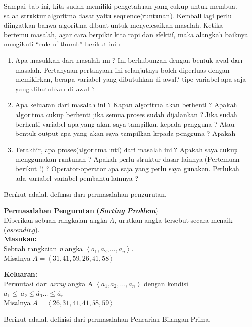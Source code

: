Sampai bab ini, kita sudah memiliki pengetahuan yang cukup untuk membuat salah struktur algoritma dasar yaitu sequence(runtunan).  Kembali lagi perlu diingatkan bahwa algoritma dibuat untuk menyelesaikan masalah. Ketika bertemu masalah, agar cara berpikir kita rapi dan efektif, maka alangkah baiknya mengikuti “rule of thumb” berikut ini : 
\begin{enumerate}
	\item Apa masukkan dari masalah ini ? Ini berhubungan dengan bentuk awal dari  masalah. Pertanyaan-pertanyaan ini selanjutnya boleh diperluas dengan memikirkan, berapa variabel yang dibutuhkan di awal? tipe variabel apa saja yang dibutuhkan  di awal ?
	\item Apa keluaran dari masalah ini ? Kapan algoritma akan berhenti ? Apakah algoritma cukup berhenti jika semua proses sudah dijalankan ?  Jika sudah berhenti variabel apa yang akan saya tampilkan kepada pengguna ? Atau bentuk output apa yang akan saya tampilkan kepada pengguna ?  Apakah 
	\item Terakhir, apa proses(algoritma inti) dari masalah ini ? Apakah saya cukup menggunakan runtunan ? Apakah perlu struktur dasar lainnya (Pertemuan berikut !) ? Operator-operator apa saja yang perlu saya gunakan. Perlukah ada variabel-variabel pembantu lainnya ?
\end{enumerate}
Berikut adalah definisi dari permasalahan pengurutan.
\begin{contoh}
\label{cth:pengurutan}
\textbf{Permasalahan Pengurutan (\textit{Sorting Problem})}\\
Diberikan sebuah rangkaian angka $A$, urutkan angka tersebut secara menaik (\textit{ascending}).\\
\textbf{Masukan:}\\
Sebuah rangkaian \textit{n} angka $\left\langle a_{1},a_{2},\ldots,a_{n} \right\rangle$.\\
Misalnya $A = \left\langle 31,41,59,26,41,58 \right\rangle$

\textbf{Keluaran:}\\ 
Permutasi dari \textit{array} angka A $\left\langle a_{1},a_{2},\ldots,a_{n}\right\rangle$ dengan kondisi $\acute{a_{1}} \leq\ \acute{a_{2}} \leq \acute{a_{3}} \ldots \leq \acute{a_{n}}$ \\
Misalnya $A = \left\langle 26,31,41,41,58,59 \right\rangle$
\end{contoh}
Berikut adalah definisi dari permasalahan Pencarian Bilangan Prima.
